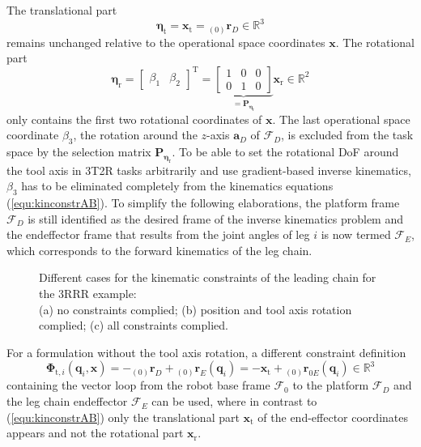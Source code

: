 \documentclass[robotics,article,submit,moreauthors,pdftex]{Definitions/mdpi}
\newcommand{\bm}[1]{\boldsymbol{#1}}
\newcommand{\ortvek}[4]{{ }_{(#1)}{\boldsymbol{#2}}^{#3}_{#4} }
\newcommand{\transp}[0]{{\mathrm{T}}}
\newcommand{\ks}[1]{{\mathcal{F}}_{#1}}
\begin{document}
The translational part
%
\begin{equation}
\bm{\eta}_{\mathrm{t}}
=
\bm{x}_{\mathrm{t}}
=
\ortvek{0}{r}{}{D}
\in {\mathbb{R}}^{3}
\end{equation}  
%
remains unchanged relative to the operational space coordinates $\bm{x}$.
The rotational part
%
\begin{equation}
\bm{\eta}_{\mathrm{r}}
=
\begin{bmatrix}
\beta_1  & \beta_2
\end{bmatrix}^\transp
=
\underbrace{\begin{bmatrix}
    1 & 0 & 0  \\ 
    0 & 1 & 0    \end{bmatrix}}_{=\bm{P}_{\bm{\eta}_\mathrm{r}}}
\bm{x}_{\mathrm{r}}
\in {\mathbb{R}}^{2}
\label{equ:etar_def}
\end{equation}
%
only contains the first two rotational coordinates of $\bm{x}$.
The last operational space coordinate $\beta_3$, the rotation around the $z$-axis $\bm{a}_{D}$ of $\ks{D}$, is excluded from the task space by the selection matrix $\bm{P}_{\bm{\eta}_\mathrm{r}}$.
To be able to set the rotational DoF around the tool axis in 3T2R tasks arbitrarily and use gradient-based inverse kinematics, $\beta_3$ has to be eliminated completely from the kinematics equations (\ref{equ:kinconstrAB}).
%
%
To simplify the following elaborations, the platform frame $\ks{D}$ is still identified as the desired frame of the inverse kinematics problem and the endeffector frame that results from the joint angles of leg $i$ is now termed $\ks{E}$, which corresponds to the forward kinematics of the leg chain.
%
\begin{figure}[tb]
    
    \caption{Different cases for the kinematic constraints of the leading chain for the 3RRR example:\\(a) no constraints complied; (b) position and tool axis rotation complied; (c) all constraints complied.}
    \label{fig:pkm_constr_rot_lead}
\end{figure} 
%
For a formulation without the tool axis rotation, a different constraint definition
%
\begin{equation}
\bm{\Phi}_{\mathrm{t},i}(\bm{q}_i,\bm{x})
= 
- \ortvek{0}{r}{}{D} + \ortvek{0}{r}{}{E}(\bm{q}_i)
=
- \bm{x}_{\mathrm{t}} + \ortvek{0}{r}{}{0E}(\bm{q}_i) \in {\mathbb{R}}^{3}
\label{equ:Phit_def_i}
\end{equation}
%
containing the vector loop from the robot base frame $\ks{0}$ to the platform $\ks{D}$ and the leg chain endeffector $\ks{E}$ can be used, where in contrast to (\ref{equ:kinconstrAB}) only the translational part $\bm{x}_{\mathrm{t}}$ of the end-effector coordinates appears and not the rotational part $\bm{x}_{\mathrm{r}}$.
\end{document}
